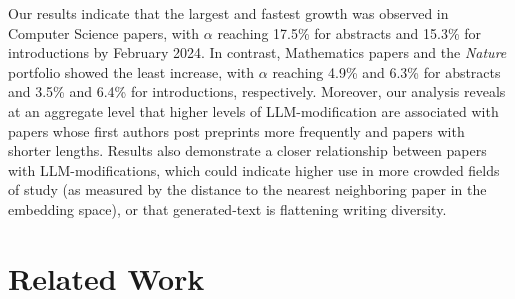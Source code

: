\documentclass{article}
\begin{document}
Our results indicate that the largest and fastest growth was observed in Computer Science papers, with $\alpha$ reaching 17.5\% for abstracts and 15.3\% for introductions by February 2024. In contrast, Mathematics papers and the \textit{Nature} portfolio showed the least increase, with $\alpha$ reaching 4.9\% and 6.3\% for abstracts and 3.5\% and 6.4\% for introductions, respectively.
Moreover, our analysis reveals at an aggregate level that higher levels of LLM-modification are associated with papers whose first authors post preprints more frequently and papers with shorter lengths. Results also demonstrate a closer relationship between papers with LLM-modifications, which could indicate higher use in more crowded fields of study (as measured by the distance to the nearest neighboring paper in the embedding space), or that generated-text is flattening writing diversity.
































 \section{Related Work}
\end{document}
